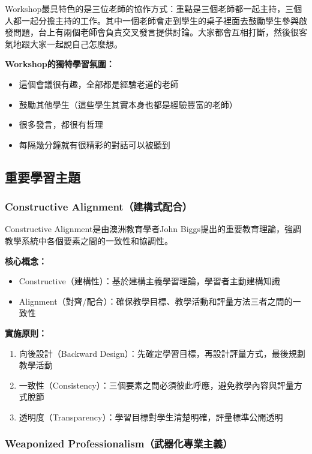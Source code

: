 \documentclass[12pt,a4paper]{article}
\begin{document}
Workshop最具特色的是三位老師的協作方式：重點是三個老師都一起主持，三個人都一起分擔主持的工作。其中一個老師會走到學生的桌子裡面去鼓勵學生參與啟發問題，台上有兩個老師會負責交叉發言提供討論。大家都會互相打斷，然後很客氣地跟大家一起說自己怎麼想。

\begin{importantbox}
\textbf{Workshop的獨特學習氛圍：}
\begin{itemize}[nosep]
    \item 這個會議很有趣，全部都是經驗老道的老師
    \item 鼓勵其他學生（這些學生其實本身也都是經驗豐富的老師）
    \item 很多發言，都很有哲理
    \item 每隔幾分鐘就有很精彩的對話可以被聽到
\end{itemize}
\end{importantbox}

\subsection{重要學習主題}

\subsubsection{Constructive Alignment（建構式配合）}

Constructive Alignment是由澳洲教育學者John Biggs提出的重要教育理論，強調教學系統中各個要素之間的一致性和協調性。

\textbf{核心概念：}
\begin{itemize}[nosep]
    \item Constructive（建構性）：基於建構主義學習理論，學習者主動建構知識
    \item Alignment（對齊/配合）：確保教學目標、教學活動和評量方法三者之間的一致性
\end{itemize}

\textbf{實施原則：}
\begin{enumerate}
    \item 向後設計（Backward Design）：先確定學習目標，再設計評量方式，最後規劃教學活動
    \item 一致性（Consistency）：三個要素之間必須彼此呼應，避免教學內容與評量方式脫節
    \item 透明度（Transparency）：學習目標對學生清楚明確，評量標準公開透明
\end{enumerate}

\subsubsection{Weaponized Professionalism（武器化專業主義）}
\end{document}
